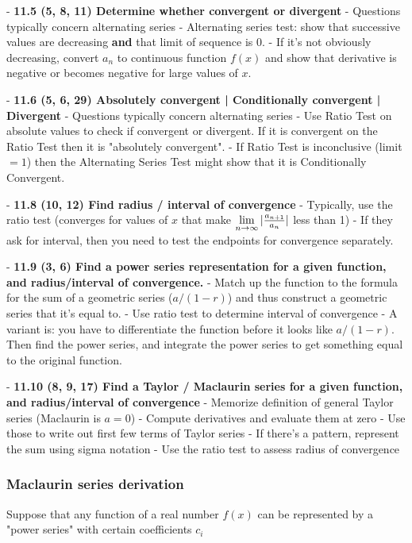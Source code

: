 - \textbf{11.5 (5, 8, 11) Determine whether convergent or divergent}
    - Questions typically concern alternating series
    - Alternating series test: show that successive values are decreasing \textbf{and} that limit of sequence is 0.
    - If it's not obviously decreasing, convert $a_n$ to continuous function $f(x)$ and show that derivative is negative or becomes negative for large values of $x$.

- \textbf{11.6 (5, 6, 29) Absolutely convergent | Conditionally convergent | Divergent}
    - Questions typically concern alternating series
    - Use Ratio Test on absolute values to check if convergent or divergent. If it is convergent on the Ratio Test then it is "absolutely convergent".
    - If Ratio Test is inconclusive (limit $= 1$) then the Alternating Series Test might show that it is Conditionally Convergent.

- \textbf{11.8 (10, 12) Find radius / interval of convergence}
    - Typically, use the ratio test (converges for values of $x$ that make $\lim\limits_{n \to \infty} |\frac{a_{n+1}}{a_n}|$ less than 1)
    - If they ask for interval, then you need to test the endpoints for convergence separately.

- \textbf{11.9 (3, 6) Find a power series representation for a given function, and radius/interval of convergence.}
    - Match up the function to the formula for the sum of a geometric series ($a/(1-r)$) and thus construct a geometric series that it's equal to.
    - Use ratio test to determine interval of convergence
    - A variant is: you have to differentiate the function before it looks like $a/(1-r)$. Then find the power series, and integrate the power series to get something equal to the original function.

- \textbf{11.10 (8, 9, 17) Find a Taylor / Maclaurin series for a given function, and radius/interval of convergence}
    - Memorize definition of general Taylor series (Maclaurin is $a=0$)
    - Compute derivatives and evaluate them at zero
    - Use those to write out first few terms of Taylor series
    - If there's a pattern, represent the sum using sigma notation
    - Use the ratio test to assess radius of convergence


\subsubsection{Maclaurin series derivation}

Suppose that any function of a real number $f(x)$ can be represented by a "power series" with certain coefficients $c_i$

